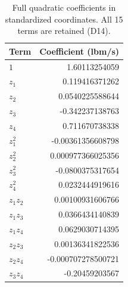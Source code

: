 \begin{table}[htbp]\centering\small\setlength{\tabcolsep}{4pt}\begin{tabular}{@{}lr@{}}\toprule
Term & Coefficient (lbm/s)\\\midrule
$1$ & 1.60113254059\\
$z_1$ & 0.119416371262\\
$z_2$ & 0.0540225588644\\
$z_3$ & -0.342237138763\\
$z_4$ & 0.711670738338\\
$z_1^2$ & -0.00361356608798\\
$z_2^2$ & 0.000977366025356\\
$z_3^2$ & -0.0800375317654\\
$z_4^2$ & 0.0232444919616\\
$z_1z_2$ & 0.00100931606766\\
$z_1z_3$ & 0.0366434140839\\
$z_1z_4$ & 0.0629030714395\\
$z_2z_3$ & 0.00136341822536\\
$z_2z_4$ & -0.000707278500721\\
$z_3z_4$ & -0.20459203567\\
\bottomrule\end{tabular}\caption{Full quadratic coefficients in standardized coordinates. All 15 terms are retained (D14).}\label{tab:polycoef}\end{table}